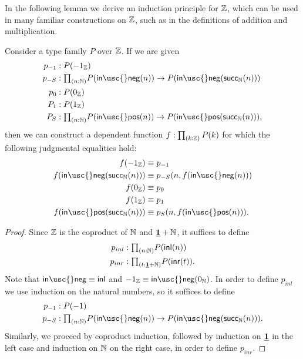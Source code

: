 In the following lemma we derive an induction principle for ${\mathbb{Z}}$, which can be used in many familiar constructions on ${\mathbb{Z}}$, such as in the definitions of addition and multiplication.

\begin{lem}\label{lem:Z_ind}
  Consider a type family $P$ over ${\mathbb{Z}}$. If we are given
  \begin{align*}
    p_{-1} & :P(-1_\Z) \\
    p_{-S} & : \prd{n:\N}P(\mathsf{in\usc{}neg}(n))\to P(\mathsf{in\usc{}neg}(\succN(n)))\\
    p_{0} & : P(0_\Z) \\
    P_{1} & : P(1_\Z) \\
    P_{S} & : \prd{n:\N}P(\mathsf{in\usc{}pos}(n))\to P(\mathsf{in\usc{}pos}(\succN(n))),
  \end{align*}
  then we can construct a dependent function $f:\prd{k:\Z}P(k)$ for which the following judgmental equalities hold:
  \begin{align*}
    f(-1_\Z) & \jdeq p_{-1} \\
    f(\mathsf{in\usc{}neg}(\mathsf{succ}_\N(n))) & \jdeq p_{-S}(n,f(\mathsf{in\usc{}neg}(n))) \\
    f(0_\Z) & \jdeq p_{0} \\
    f(1_\Z) & \jdeq p_{1} \\
    f(\mathsf{in\usc{}pos}(\mathsf{succ}_\N(n))) & \jdeq p_S(n,f(\mathsf{in\usc{}pos}(n))).
  \end{align*}
\end{lem}

\begin{proof}
  Since ${\mathbb{Z}}$ is the coproduct of ${\mathbb{N}}$ and $\underline{\mathbf{1}}+{\mathbb{N}}$, it suffices to define
  \begin{align*}
    p_{inl} & : \prd{n:\N}P(\inl(n)) \\
    p_{inr} & : \prd{t:\unit+\N}P(\inr(t)).
  \end{align*}
  Note that $\mathsf{in\usc{}neg}\jdeq\inl$ and $-1_\Z\jdeq \mathsf{in\usc{}neg}(\zeroN)$. In order to define $p_{inl}$ we use induction on the natural numbers, so it suffices to define
  \begin{align*}
    p_{-1} & : P(-1) \\
    p_{-S} & : \prd{n:\N} P(\mathsf{in\usc{}neg}(n))\to P(\mathsf{in\usc{}neg}(\succN(n))).
  \end{align*}
  Similarly, we proceed by coproduct induction, followed by induction on $\underline{\mathbf{1}}$ in the left case and induction on ${\mathbb{N}}$ on the right case, in order to define $p_{inr}$. 
\end{proof}

